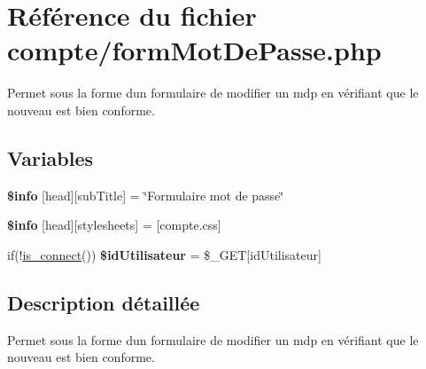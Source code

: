 \hypertarget{formMotDePasse_8php}{}\section{Référence du fichier compte/form\+Mot\+De\+Passe.php}
\label{formMotDePasse_8php}


Permet sous la forme d\textquotesingle{}un formulaire de modifier un mdp en vérifiant que le nouveau est bien conforme.  


\subsection*{Variables}
\begin{DoxyCompactItemize}
\item 
\mbox{\label{formMotDePasse_8php_a024f87f9bf4f3b33710e2e7ff8f60823}} 
{\bfseries \$info} \mbox{[}\textquotesingle{}head\textquotesingle{}\mbox{]}\mbox{[}\textquotesingle{}sub\+Title\textquotesingle{}\mbox{]} = \char`\"{}Formulaire mot de passe\char`\"{}
\item 
\mbox{\label{formMotDePasse_8php_af6044c8bf78ebc8c58057e14d7738bbd}} 
{\bfseries \$info} \mbox{[}\textquotesingle{}head\textquotesingle{}\mbox{]}\mbox{[}\textquotesingle{}stylesheets\textquotesingle{}\mbox{]} = \mbox{[}\textquotesingle{}compte.\+css\textquotesingle{}\mbox{]}
\item 
\mbox{\label{formMotDePasse_8php_ad382ed547ebf427b6b54431506a707c3}} 
if(!\hyperlink{fonctionCompte_8php_a2fe594e0482307b8729ea37780d6f74b}{is\+\_\+connect}()) {\bfseries \$id\+Utilisateur} = \$\+\_\+\+G\+ET\mbox{[}\textquotesingle{}id\+Utilisateur\textquotesingle{}\mbox{]}
\end{DoxyCompactItemize}


\subsection{Description détaillée}
Permet sous la forme d\textquotesingle{}un formulaire de modifier un mdp en vérifiant que le nouveau est bien conforme. 

